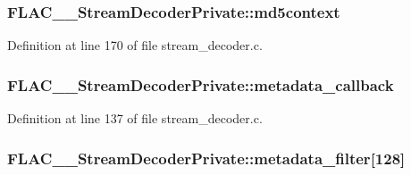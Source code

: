 \subsubsection[{\texorpdfstring{md5context}{md5context}}]{ F\+L\+A\+C\+\_\+\+\_\+\+Stream\+Decoder\+Private\+::md5context}\hypertarget{struct_f_l_a_c_____stream_decoder_private_aca2ffc6b82be2383425a14f319467ee8}{}\label{struct_f_l_a_c_____stream_decoder_private_aca2ffc6b82be2383425a14f319467ee8}


Definition at line 170 of file stream\+\_\+decoder.\+c.

\subsubsection[{\texorpdfstring{metadata\+\_\+callback}{metadata_callback}}]{ F\+L\+A\+C\+\_\+\+\_\+\+Stream\+Decoder\+Private\+::metadata\+\_\+callback}\hypertarget{struct_f_l_a_c_____stream_decoder_private_a45879877f15a96ec5d05df4a8893ed96}{}\label{struct_f_l_a_c_____stream_decoder_private_a45879877f15a96ec5d05df4a8893ed96}


Definition at line 137 of file stream\+\_\+decoder.\+c.

\subsubsection[{\texorpdfstring{metadata\+\_\+filter}{metadata_filter}}]{ F\+L\+A\+C\+\_\+\+\_\+\+Stream\+Decoder\+Private\+::metadata\+\_\+filter\mbox{[}128\mbox{]}}\hypertarget{struct_f_l_a_c_____stream_decoder_private_a3f07fd361920576396a9a0a82d44b625}{}\label{struct_f_l_a_c_____stream_decoder_private_a3f07fd361920576396a9a0a82d44b625}


